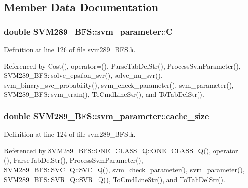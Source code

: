 \subsection{Member Data Documentation}
\subsubsection[{\texorpdfstring{C}{C}}]{\setlength{\rightskip}{0pt plus 5cm}double S\+V\+M289\+\_\+\+B\+F\+S\+::svm\+\_\+parameter\+::C}\hypertarget{struct_s_v_m289___b_f_s_1_1svm__parameter_a6e819bf58fb2b36b28cdf4abf22e3371}{}\label{struct_s_v_m289___b_f_s_1_1svm__parameter_a6e819bf58fb2b36b28cdf4abf22e3371}


Definition at line 126 of file svm289\+\_\+\+B\+F\+S.\+h.



Referenced by Cost(), operator=(), Parse\+Tab\+Del\+Str(), Process\+Svm\+Parameter(), S\+V\+M289\+\_\+\+B\+F\+S\+::solve\+\_\+epsilon\+\_\+svr(), solve\+\_\+nu\+\_\+svr(), svm\+\_\+binary\+\_\+svc\+\_\+probability(), svm\+\_\+check\+\_\+parameter(), svm\+\_\+parameter(), S\+V\+M289\+\_\+\+B\+F\+S\+::svm\+\_\+train(), To\+Cmd\+Line\+Str(), and To\+Tab\+Del\+Str().

\subsubsection[{\texorpdfstring{cache\+\_\+size}{cache_size}}]{\setlength{\rightskip}{0pt plus 5cm}double S\+V\+M289\+\_\+\+B\+F\+S\+::svm\+\_\+parameter\+::cache\+\_\+size}\hypertarget{struct_s_v_m289___b_f_s_1_1svm__parameter_a2b25c48b9aa65c33e47dc3ed3368c30f}{}\label{struct_s_v_m289___b_f_s_1_1svm__parameter_a2b25c48b9aa65c33e47dc3ed3368c30f}


Definition at line 124 of file svm289\+\_\+\+B\+F\+S.\+h.



Referenced by S\+V\+M289\+\_\+\+B\+F\+S\+::\+O\+N\+E\+\_\+\+C\+L\+A\+S\+S\+\_\+\+Q\+::\+O\+N\+E\+\_\+\+C\+L\+A\+S\+S\+\_\+\+Q(), operator=(), Parse\+Tab\+Del\+Str(), Process\+Svm\+Parameter(), S\+V\+M289\+\_\+\+B\+F\+S\+::\+S\+V\+C\+\_\+\+Q\+::\+S\+V\+C\+\_\+\+Q(), svm\+\_\+check\+\_\+parameter(), svm\+\_\+parameter(), S\+V\+M289\+\_\+\+B\+F\+S\+::\+S\+V\+R\+\_\+\+Q\+::\+S\+V\+R\+\_\+\+Q(), To\+Cmd\+Line\+Str(), and To\+Tab\+Del\+Str().

